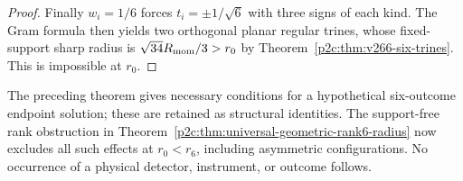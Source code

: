 \documentclass[12pt,a4paper]{article}
\begin{document}
\begin{proof}
Finally $w_i=1/6$ forces $t_i=\pm1/\sqrt6$ with three signs of each kind.
The Gram formula then yields two orthogonal planar regular trines,
whose fixed-support sharp radius is $\sqrt{34}R_{\rm mom}/3>r_0$
by Theorem~\ref{p2c:thm:v266-six-trines}. This is impossible at $r_0$.
\end{proof}
\begin{remark}
The preceding theorem gives necessary conditions for a hypothetical
six-outcome endpoint solution; these are retained as structural
identities. The support-free rank obstruction in
Theorem~\ref{p2c:thm:universal-geometric-rank6-radius} now excludes
all such effects at $r_0<r_6$, including asymmetric configurations.
No occurrence of a physical detector, instrument, or outcome follows.
\end{remark}
\end{document}
